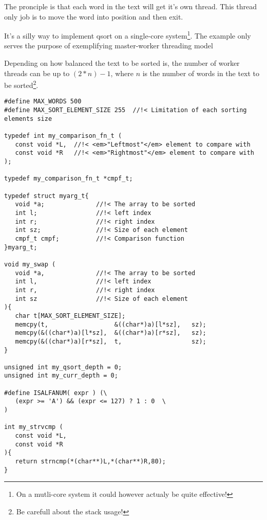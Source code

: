 The pronciple is that each word in the text will get it's own thread. This thread only job is to move the word into position and then exit.

It's a silly way to implement qsort on a single-core system\footnote{On a mutli-core system it could however actualy be quite effective!}. The example only serves the purpose of exemplifying master-worker threading model

Depending on how balanced the text to be sorted is, the number of worker threads can be up to $(2 * n) - 1$, where $n$ is the number of words in the text to be sorted\footnote{Be carefull about the stack usage!}.

\begin{table}[!hbp]
\begin{verbatim}
#define MAX_WORDS 500
#define MAX_SORT_ELEMENT_SIZE 255  //!< Limitation of each sorting elements size

typedef int my_comparison_fn_t (  
   const void *L,  //!< <em>"Leftmost"</em> element to compare with
   const void *R   //!< <em>"Rightmost"</em> element to compare with
);

typedef my_comparison_fn_t *cmpf_t;

typedef struct myarg_t{
   void *a;              //!< The array to be sorted
   int l;                //!< left index
   int r;                //!< right index
   int sz;               //!< Size of each element
   cmpf_t cmpf;          //!< Comparison function 
}myarg_t;

void my_swap (
   void *a,              //!< The array to be sorted
   int l,                //!< left index
   int r,                //!< right index
   int sz                //!< Size of each element   
){
   char t[MAX_SORT_ELEMENT_SIZE];
   memcpy(t,                  &((char*)a)[l*sz],   sz);
   memcpy(&((char*)a)[l*sz],  &((char*)a)[r*sz],   sz);
   memcpy(&((char*)a)[r*sz],  t,                   sz);
}

unsigned int my_qsort_depth = 0; 
unsigned int my_curr_depth = 0;  

#define ISALFANUM( expr ) (\
   (expr >= 'A') && (expr <= 127) ? 1 : 0  \
)

int my_strvcmp (  
   const void *L,
   const void *R 
){
   return strncmp(*(char**)L,*(char**)R,80);   
}
\end{verbatim}
\caption{Structures and data.\label{ccsort_structs}}
\end{table}

